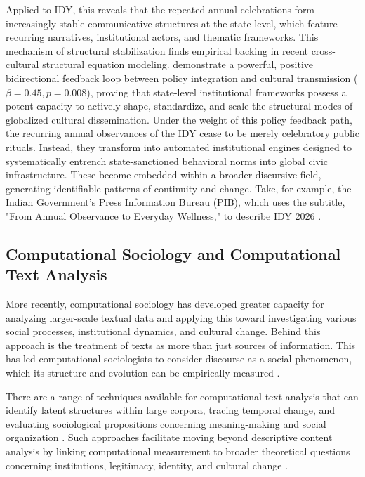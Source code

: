 \documentclass[11pt]{article}
\begin{document}
Applied to IDY, this reveals that the repeated annual celebrations form increasingly stable communicative structures at the state level, which feature recurring narratives, institutional actors, and thematic frameworks. This mechanism of structural stabilization finds empirical backing in recent cross-cultural structural equation modeling. \citet{zhou2026yoga} demonstrate a powerful, positive bidirectional feedback loop between policy integration and cultural transmission ($\beta = 0.45, p = 0.008$), proving that state-level institutional frameworks possess a potent capacity to actively shape, standardize, and scale the structural modes of globalized cultural dissemination. Under the weight of this policy feedback path, the recurring annual observances of the IDY cease to be merely celebratory public rituals. Instead, they transform into automated institutional engines designed to systematically entrench state-sanctioned behavioral norms into global civic infrastructure. These become embedded within a broader discursive field, generating identifiable patterns of continuity and change. Take, for example, the Indian Government's Press Information Bureau (PIB), which uses the subtitle, "From Annual Observance to Everyday Wellness," to describe IDY 2026 \cite{pib_idy_2026}.


\subsection{Computational Sociology and Computational Text Analysis}

More recently, computational sociology has developed greater capacity for analyzing larger-scale textual data and applying this toward investigating various social processes, institutional dynamics, and cultural change. Behind this approach is the treatment of texts as more than just sources of information. This has led computational sociologists to consider discourse as a social phenomenon, which its structure and evolution can be empirically measured \cite{keuschnigg2018}.

There are a range of techniques available for computational text analysis that can identify latent structures within large corpora, tracing temporal change, and evaluating sociological propositions concerning meaning-making and social organization \cite{camilleri2021}. Such approaches facilitate moving beyond descriptive content analysis by linking computational measurement to broader theoretical questions concerning institutions, legitimacy, identity, and cultural change \cite{bonikowski2022,hurtadobodell2026}.
\end{document}
